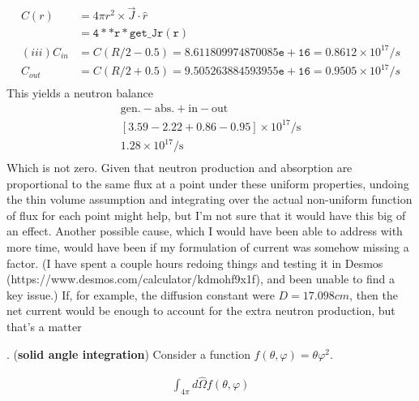 \documentclass[11pt]{article}
\newcommand{\beq}{\begin{equation}\begin{aligned}}
\newcommand{\eeq}{\end{aligned}\end{equation}}
\begin{document}
\begin{enumerate}
{    \begin{align*}
        C(r)&=4\pi r^2\times \vec{J}\cdot\hat{r} \\
            &=\mathtt{4**r*get\_Jr(r)}\\
        (iii)C_{in}&=C(R/2-0.5)=\mathtt{8.611809974870085e+16}=\boxed{0.8612\times10^{17}/s} \\
        C_{out}&=C(R/2+0.5)=\mathtt{9.505263884593955e+16}=\boxed{0.9505\times10^{17}/s} \\
    \end{align*}
    This yields a neutron balance 
    \begin{gather*}
        \mathrm{gen.-abs.+in-out} \\
        \left[3.59 - 2.22 + 0.86 - 0.95\right]\times10^{17}/\mathrm{s}\\
        1.28\times10^{17}/\mathrm{s}\\
    \end{gather*}
    Which is not zero. 
    Given that neutron production and absorption are proportional to the same flux at a point under these uniform properties, undoing the thin volume assumption and integrating over the actual non-uniform function of flux for each point might help, but I'm not sure that it would have this big of an effect.
    Another possible cause, which I would have been able to address with more time, would have been if my formulation of current was somehow missing a factor. (I have spent a couple hours redoing things and testing it in Desmos (https://www.desmos.com/calculator/kdmohf9x1f), and been unable to find a key issue.)
    If, for example, the diffusion constant were $D=17.098cm$, then the net current would be enough to account for the extra neutron production, but that's a matter 
}
\end{enumerate}

\clearpage
{}. ({\bf solid angle integration}) Consider a function $f(\theta,\varphi)=\theta\varphi^2$. 

\beq
\int_{4\pi}d\hat{\Omega} f(\theta,\varphi)
\eeq
\end{document}
